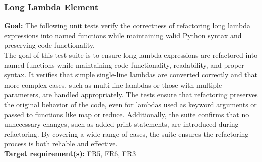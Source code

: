 \documentclass[12pt, titlepage]{article}
\begin{document}
  \subsubsection{Long Lambda Element}

  \textbf{Goal:} The following unit tests verify the correctness of
  refactoring long lambda expressions into named functions while
  maintaining valid Python syntax and preserving code functionality.\\

  \noindent The goal of this test suite is to ensure long lambda
  expressions are refactored into named
  functions while maintaining code functionality, readability, and
  proper syntax. It verifies
  that simple single-line lambdas are converted correctly and that
  more complex cases, such as
  multi-line lambdas or those with multiple parameters, are handled
  appropriately. The tests
  ensure that refactoring preserves the original behavior of the
  code, even for lambdas used
  as keyword arguments or passed to functions like map or reduce.
  Additionally, the suite
  confirms that no unnecessary changes, such as added print
  statements, are introduced during
  refactoring. By covering a wide range of cases, the suite ensures
  the refactoring process
  is both reliable and effective.\\

  \noindent \textbf{Target requirement(s):} FR5, FR6, FR3 ~\cite{SRS} \\
\end{document}
